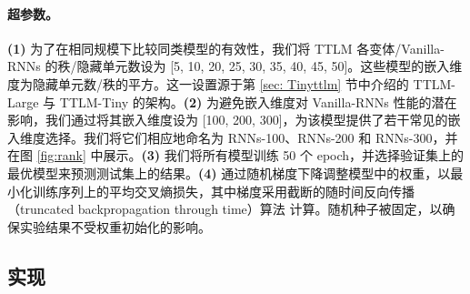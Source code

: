 \documentclass{article}
\theoremstyle{plain}
\theoremstyle{definition}
\theoremstyle{remark}
\begin{document}




\paragraph{超参数。} \textbf{(1)} 为了在相同规模下比较同类模型的有效性，我们将 TTLM 各变体/Vanilla-RNNs 的秩/隐藏单元数设为 [5, 10, 20, 25, 30, 35, 40, 45, 50]。这些模型的嵌入维度为隐藏单元数/秩的平方。这一设置源于第 \ref{sec: Tinyttlm} 节中介绍的 TTLM-Large 与 TTLM-Tiny 的架构。\textbf{(2)} 为避免嵌入维度对 Vanilla-RNNs 性能的潜在影响，我们通过将其嵌入维度设为 [100, 200, 300]，为该模型提供了若干常见的嵌入维度选择。我们将它们相应地命名为 RNNs-100、RNNs-200 和 RNNs-300，并在图 \ref{fig:rank} 中展示。\textbf{(3)} 我们将所有模型训练 50 个 epoch，并选择验证集上的最优模型来预测测试集上的结果。\textbf{(4)} 通过随机梯度下降调整模型中的权重，以最小化训练序列上的平均交叉熵损失，其中梯度采用截断的随时间反向传播（truncated backpropagation through time）算法 \citep{werbos1990backpropagation,williams1990efficient} 计算。随机种子被固定，以确保实验结果不受权重初始化的影响。
\subsection{实现}
\label{sec:implementations}
\end{document}
